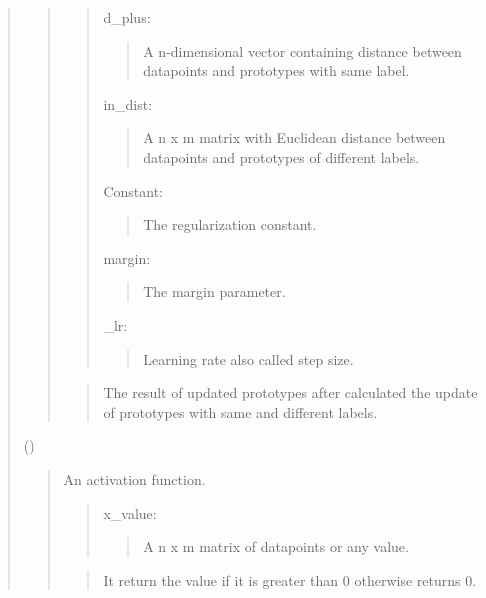 \documentclass[letterpaper,10pt,english,openany,oneside]{sphinxmanual}
\begin{document}
\begin{quote}
\begin{quote}
\begin{quote}
d\_plus:
\begin{quote}

A n-dimensional vector containing distance between datapoints and prototypes with same label.
\end{quote}

in\_dist:
\begin{quote}

A n x m matrix with Euclidean distance between datapoints and prototypes of different labels.
\end{quote}

Constant:
\begin{quote}

The regularization constant.
\end{quote}

margin:
\begin{quote}

The margin parameter.
\end{quote}

\_lr:
\begin{quote}

Learning rate also called step size.
\end{quote}
\end{quote}

\begin{quote}

The result of updated prototypes after calculated the update of prototypes with same and different labels.
\end{quote}
\end{quote}

()
\begin{quote}

An activation function.

\begin{quote}

x\_value:
\begin{quote}

A n x m matrix of datapoints or any value.
\end{quote}
\end{quote}

\begin{quote}

It return the value if it is greater than 0 otherwise returns 0.
\end{quote}
\end{quote}


\end{quote}
\end{document}
